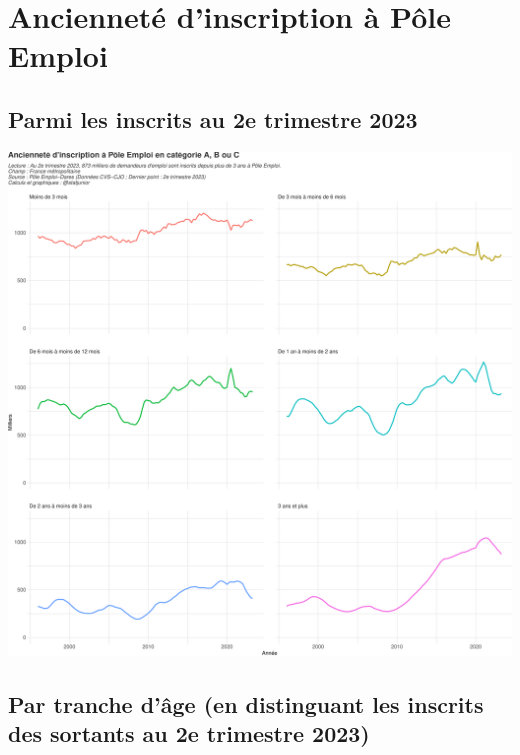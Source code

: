 \documentclass[
  paper=a4,
  ,captions=tableheading
]{scrartcl}
\begin{document}
\hypertarget{anciennetuxe9-dinscription-uxe0-puxf4le-emploi}{%
\section{Ancienneté d'inscription à Pôle
Emploi}\label{anciennetuxe9-dinscription-uxe0-puxf4le-emploi}}

\hypertarget{parmi-les-inscrits-au-2e-trimestre-2023}{%
\subsection{Parmi les inscrits au 2e trimestre
2023}\label{parmi-les-inscrits-au-2e-trimestre-2023}}

\includegraphics{rapport_pdf_demandeurs_emploi_pole_emploi_files/figure-latex/unnamed-chunk-11-1.pdf}

\hypertarget{par-tranche-duxe2ge-en-distinguant-les-inscrits-des-sortants-au-2e-trimestre-2023}{%
\subsection{Par tranche d'âge (en distinguant les inscrits des sortants
au 2e trimestre
2023)}\label{par-tranche-duxe2ge-en-distinguant-les-inscrits-des-sortants-au-2e-trimestre-2023}}
\end{document}
